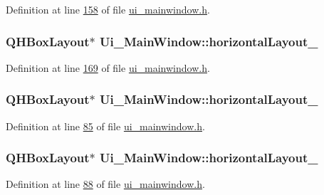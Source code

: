 Definition at line \hyperlink{a00052_source_l00158}{158} of file \hyperlink{a00052_source}{ui\+\_\+mainwindow.\+h}.

\hypertarget{a00027_a03ce63974cc69b067c91bbf285cceca8}{
\subsubsection[{horizontal\+Layout\+\_\+3}]{\setlength{\rightskip}{0pt plus 5cm}Q\+H\+Box\+Layout$\ast$ Ui\+\_\+\+Main\+Window\+::horizontal\+Layout\+\_}}\label{a00027_a03ce63974cc69b067c91bbf285cceca8}


Definition at line \hyperlink{a00052_source_l00169}{169} of file \hyperlink{a00052_source}{ui\+\_\+mainwindow.\+h}.

\hypertarget{a00027_ae183387a7d233b437a637b403ba39ffd}{
\subsubsection[{horizontal\+Layout\+\_\+4}]{\setlength{\rightskip}{0pt plus 5cm}Q\+H\+Box\+Layout$\ast$ Ui\+\_\+\+Main\+Window\+::horizontal\+Layout\+\_}}\label{a00027_ae183387a7d233b437a637b403ba39ffd}


Definition at line \hyperlink{a00052_source_l00085}{85} of file \hyperlink{a00052_source}{ui\+\_\+mainwindow.\+h}.

\hypertarget{a00027_a14c9d4842c3e97e16e7873ef0aecdb1e}{
\subsubsection[{horizontal\+Layout\+\_\+5}]{\setlength{\rightskip}{0pt plus 5cm}Q\+H\+Box\+Layout$\ast$ Ui\+\_\+\+Main\+Window\+::horizontal\+Layout\+\_}}\label{a00027_a14c9d4842c3e97e16e7873ef0aecdb1e}


Definition at line \hyperlink{a00052_source_l00088}{88} of file \hyperlink{a00052_source}{ui\+\_\+mainwindow.\+h}.


